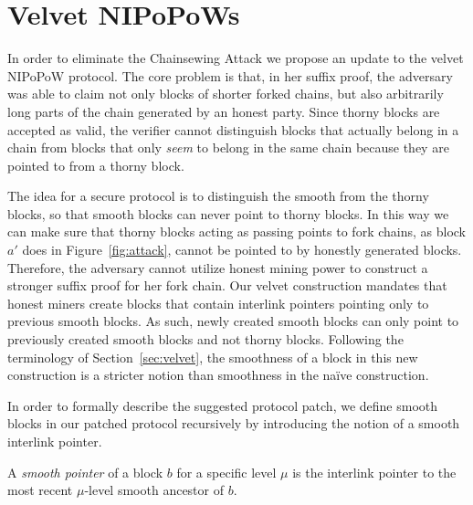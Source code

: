 \section{Velvet NIPoPoWs}\label{sec:construction}
In order to eliminate the Chainsewing Attack we propose an update to the velvet NIPoPoW protocol. The core problem is that, in her suffix proof, the adversary was able to claim not only blocks of shorter forked chains, but also arbitrarily long parts of the chain generated by an honest party. Since thorny blocks are accepted as valid, the verifier cannot distinguish blocks that actually belong in a chain from blocks that only \emph{seem} to belong in the same chain because they are pointed to from a thorny block.

The idea for a secure protocol is to distinguish the smooth from the thorny blocks, so that smooth blocks can never point to thorny blocks. In this way we can make sure that thorny blocks acting as passing points to fork chains, as block $a'$ does in Figure~\ref{fig:attack}, cannot be pointed to by honestly generated blocks. Therefore, the adversary cannot utilize honest mining power to construct a stronger suffix proof for her fork chain. Our velvet construction mandates that honest miners create blocks that contain interlink pointers pointing only to previous smooth blocks. As such, newly created smooth blocks can only point to previously created smooth blocks and not thorny blocks. Following the terminology of Section~\ref{sec:velvet}, the smoothness of a block in this new construction is a stricter notion than smoothness in the na\"ive construction.

In order to formally describe the suggested protocol patch, we define smooth blocks in our patched protocol recursively by introducing the notion of a smooth interlink pointer.

\begin{definition}
  A \emph{smooth pointer} of a block $b$ for a specific level $\mu$ is the interlink pointer to the most recent $\mu$-level smooth ancestor of $b$.
	\label{defn:smooth_pointer}
\end{definition}

